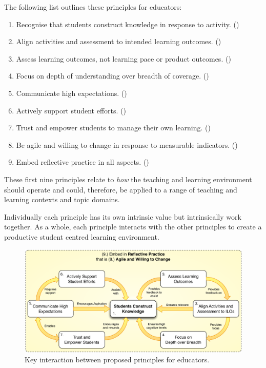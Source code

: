 The following list outlines these principles for educators:
\begin{enumerate}
	\item Recognise that students construct knowledge in response to activity. ()
	\item Align activities and assessment to intended learning outcomes. ()
	\item Assess learning outcomes, not learning pace or product outcomes. ()
	\item Focus on depth of understanding over breadth of coverage. ()
	\item Communicate high expectations. ()
	\item Actively support student efforts. ()
	\item Trust and empower students to manage their own learning. ()
	\item Be agile and willing to change in response to measurable indicators. ()
	\item Embed reflective practice in all aspects. ()
\end{enumerate}

These first nine principles relate to \emph{how} the teaching and learning environment should operate and could, therefore, be applied to a range of teaching and learning contexts and topic domains.


Individually each principle has its own intrinsic value but intrinsically work together. As a whole, each principle interacts with the other principles to create a productive student centred learning environment.

\begin{figure}[htbp]
	\centering
	\includegraphics[width=\textwidth]{HowPrinciples}
	\caption{Key interaction between proposed principles for educators.}
	\label{fig:how_principles}
\end{figure}

